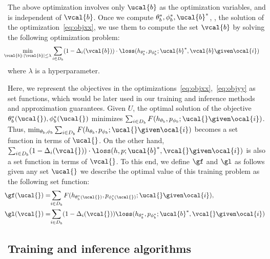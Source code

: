 \documentclass[letterpaper]{article}
\begin{document}
 The above optimization involves only $\ucal{b}$ as the optimization variables, and is independent of $\vcal{b}$. Once we compute $\theta_b ^*, \phi_b ^*, \ucal{b} ^*$, \ie, the solution of the optimization~\eqref{eq:objxx}, we use them to compute the set $\vcal{b}$ by solving the following optimization problem:
\begin{align}
&\hspace{-3mm} \min_{\vcal{b}: |\vcal{b}|\le\lambda } \sum_{i\in D_b} (1-\Delta_i(\vcal{b}) )\cdot \loss(h_{\theta_b ^*},p_{\phi_b ^*}; \ucal{b}^*, \vcal{b}\given \ocal{i} ) \label{eq:objyy}
 \end{align}
where $\lambda$ is a hyperparameter.

 Here, we represent the objectives in the optimizations~\eqref{eq:objxx},~\eqref{eq:objyy} as set functions, which would be later used in our training and inference methods and approximation guarantees. Given $U$,  the optimal solution of the objective $\theta_b ^*(\ucal{}), \phi_b ^*(\ucal{})$  minimizes
  $\sum_{i\in D_b}F(h_{\theta_b},p_{\phi_b};\ucal{} \given \ocal{i})$. Thus,  $\min_{\theta_b, \phi_b}\sum_{i\in D_b}F(h_{\theta_b},p_{\phi_b};\ucal{} \given \ocal{i})$ becomes a set function in terms of $\ucal{}$. On the other hand,  $  \sum_{i\in D_b} (1-\Delta_i(\vcal{}) )\cdot \loss(h,p; \ucal{b}^*, \vcal{}\given \ocal{i} )$ is also a set function in terms of  $\vcal{}$.
 To this end, we define $\gf$ and $\gl$ as follows
 given any set $\ucal{}$ we
 describe the optimal value of this training problem as the following set function:
 \begin{align}
&   \hspace{-2mm}  \gf(\ucal{})  = \hspace{-1mm}\sum_{i\in D_b}F(h_{\theta_b ^*(\ucal{})},p_{\phi_b ^*(\ucal{})};\ucal{} \given \ocal{i}),  \label{eq:Gdefx}
 \\
 &\hspace{-2mm} \gl(\vcal{})  = \hspace{-1mm}\sum_{i\in D_b} (1-\Delta_i(\vcal{}) )  \loss(h_{\theta_b ^* },p_{\phi_b ^* }; \ucal{b}^*, \vcal{}\given \ocal{i} )
     \label{eq:Gdef}
 \end{align}



 \subsection{Training and inference algorithms}
\end{document}
